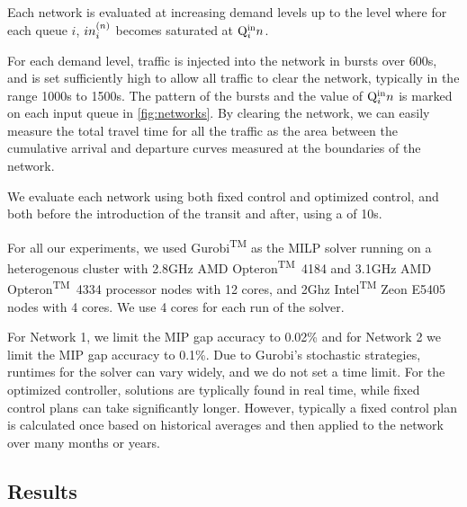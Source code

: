 Each network is evaluated at increasing demand levels up to the level where for each queue $i$, 
$in_{i}^{(n)}$ becomes saturated at $\mathrm{Q}_{i}^{\mathrm{in}}{n}$.

For each demand level, traffic is injected into the network
in bursts over 600s, and \TMAX is set sufficiently high to allow all traffic to
clear the network, typically in the range 1000s to 1500s.
The pattern of the bursts and the value of 
$\mathrm{Q}_{i}^{\mathrm{in}}{n}$ is marked on each input queue in \cref{fig:networks}.
%
By clearing the network, we can easily measure the total travel time for all the
traffic as the area between the cumulative arrival and departure curves measured
at the boundaries of the network.
%
%
%

We evaluate each network using both fixed control and optimized control,
and both before the introduction of the transit and after, using a \DT[] of
10s.

For all our experiments, we used Gurobi\textsuperscript{TM} as the MILP solver running on a heterogenous cluster
 with 2.8GHz AMD Opteron\textsuperscript{TM}~4184 and 3.1GHz AMD Opteron\textsuperscript{TM}~4334 processor nodes with 12 cores, and 2Ghz Intel\textsuperscript{TM} Zeon E5405 nodes with 4 cores. We use 4 cores for each run of the solver.

For Network 1, we limit the MIP gap accuracy to 0.02\% and for Network 2 we limit the MIP gap accuracy to 0.1\%.
%
Due to Gurobi's stochastic strategies, runtimes for the solver can vary widely, and we do not set a time limit. For the optimized controller, solutions are typlically found in real time, while fixed control plans can take significantly longer. However, typically a fixed control plan is calculated once based on historical averages and then applied to the network over many months or years.

\subsection{Results}


